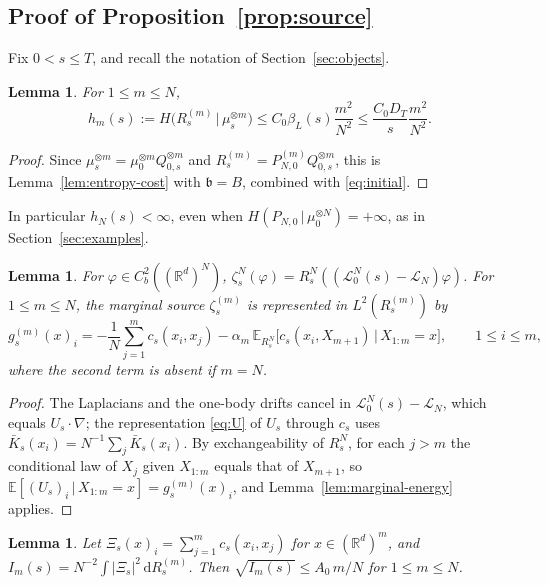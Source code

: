 \documentclass[11pt]{amsart}
\numberwithin{equation}{section}
\theoremstyle{plain}
\newtheorem{lemma}[theorem]{Lemma}
\theoremstyle{remark}
\newcommand{\R}{\mathbb{R}}
\newcommand{\E}{\mathbb{E}}
\newcommand{\cL}{\mathcal{L}}
\newcommand{\dd}{\mathrm{d}}
\begin{document}
\subsection{Proof of Proposition~\ref{prop:source}}
Fix $0<s\le T$, and recall the notation of Section~\ref{sec:objects}.

\begin{lemma}\label{lem:reference-H}
For $1\le m\le N$,
\begin{equation}\label{eq:ref-H}
h_m(s):=H\big(R^{(m)}_s\,\big|\,\mu_s^{\otimes m}\big)\le C_0\beta_L(s)\frac{m^2}{N^2}\le\frac{C_0D_T}{s}\frac{m^2}{N^2}.
\end{equation}
\end{lemma}

\begin{proof}
Since $\mu_s^{\otimes m}=\mu_0^{\otimes m}Q_{0,s}^{\otimes m}$ and $R^{(m)}_s=P^{(m)}_{N,0}Q_{0,s}^{\otimes m}$, this is Lemma~\ref{lem:entropy-cost} with $\mathfrak b=B$, combined with \eqref{eq:initial}.
\end{proof}

In particular $h_N(s)<\infty$, even when $H(P_{N,0}\,|\,\mu_0^{\otimes N})=+\infty$, as in Section~\ref{sec:examples}.

\begin{lemma}\label{lem:source-rep}
For $\varphi\in C^2_b((\R^d)^N)$, $\zeta^N_s(\varphi)=R^N_s((\cL^N_0(s)-\cL_N)\varphi)$. For $1\le m\le N$, the marginal source $\zeta^{(m)}_s$ is represented in $L^2(R^{(m)}_s)$ by
\begin{equation}\label{eq:g}
g^{(m)}_s(x)_i=-\frac1N\sum_{j=1}^mc_s(x_i,x_j)-\alpha_m\,\E_{R^N_s}\big[c_s(x_i,X_{m+1})\,\big|\,X_{1:m}=x\big],\qquad 1\le i\le m,
\end{equation}
where the second term is absent if $m=N$.
\end{lemma}

\begin{proof}
The Laplacians and the one-body drifts cancel in $\cL^N_0(s)-\cL_N$, which equals $U_s\cdot\nabla$; the representation \eqref{eq:U} of $U_s$ through $c_s$ uses $\bar K_s(x_i)=N^{-1}\sum_j\bar K_s(x_i)$. By exchangeability of $R^N_s$, for each $j>m$ the conditional law of $X_j$ given $X_{1:m}$ equals that of $X_{m+1}$, so $\E[(U_s)_i\,|\,X_{1:m}=x]=g^{(m)}_s(x)_i$, and Lemma~\ref{lem:marginal-energy} applies.
\end{proof}

\begin{lemma}\label{lem:internal}
Let $\Xi_s(x)_i=\sum_{j=1}^mc_s(x_i,x_j)$ for $x\in(\R^d)^m$, and $I_m(s)=N^{-2}\int|\Xi_s|^2\,\dd R^{(m)}_s$. Then $\sqrt{I_m(s)}\le A_0\,m/N$ for $1\le m\le N$.
\end{lemma}
\end{document}
